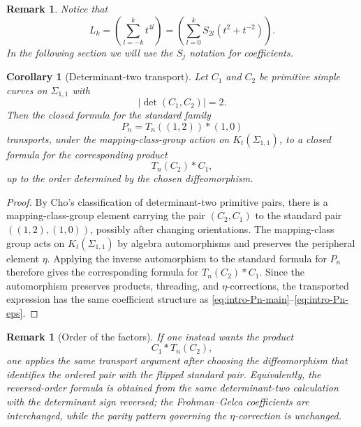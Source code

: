 \documentclass[12pt]{article}
\newtheorem{corollary}[theorem]{Corollary}
\newtheorem{remark}[theorem]{Remark}
\begin{document}
\begin{remark}
Notice that 
\[
L_k = \left( \sum_{l=-k}^{k} t^{4l} \right) = \left( \sum_{l=0}^{k} S_{2l}(t^2+t^{-2}) \right).
\]
In the following section we will use the $S_j$ notation for coefficients.
\end{remark}




\begin{corollary}[Determinant-two transport]\label{cor:det-two-transport}
Let $C_1$ and $C_2$ be primitive simple curves on $\Sigma_{1,1}$ with
\[
|\det(C_1,C_2)|=2.
\]
Then the closed formula for the standard family
\[
P_n=T_n((1,2))\ast(1,0)
\]
transports, under the mapping-class-group action on $K_t(\Sigma_{1,1})$, to a closed formula for the corresponding product
\[
T_n(C_2)\ast C_1,
\]
up to the order determined by the chosen diffeomorphism.
\end{corollary}

\begin{proof}
By Cho's classification of determinant-two primitive pairs, there is a mapping-class-group element carrying the pair $(C_2,C_1)$ to the standard pair $((1,2),(1,0))$, possibly after changing orientations. The mapping-class group acts on $K_t(\Sigma_{1,1})$ by algebra automorphisms and preserves the peripheral element $\eta$. Applying the inverse automorphism to the standard formula for $P_n$ therefore gives the corresponding formula for $T_n(C_2)\ast C_1$. Since the automorphism preserves products, threading, and $\eta$-corrections, the transported expression has the same coefficient structure as \eqref{eq:intro-Pn-main}--\eqref{eq:intro-Pn-eps}.
\end{proof}

\begin{remark}[Order of the factors]
If one instead wants the product
\[
C_1\ast T_n(C_2),
\]
one applies the same transport argument after choosing the diffeomorphism that identifies the ordered pair with the flipped standard pair. Equivalently, the reversed-order formula is obtained from the same determinant-two calculation with the determinant sign reversed; the Frohman--Gelca coefficients are interchanged, while the parity pattern governing the $\eta$-correction is unchanged.
\end{remark}
\end{document}

